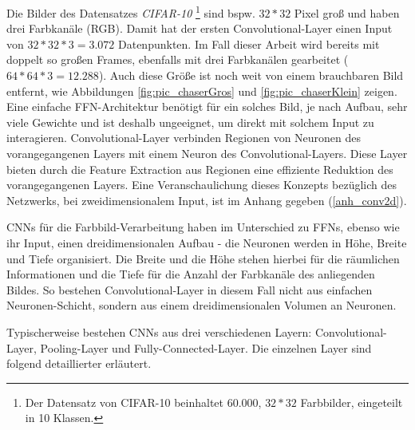 Die Bilder des Datensatzes \emph{CIFAR-10} \footnote{\label{foot:absch_RL_CNN_CIFAR10} Der Datensatz von CIFAR-10 beinhaltet 60.000, $32*32$ Farbbilder, eingeteilt in 10 Klassen.} \cite{cifar10_krizhevsky} sind bspw. $32*32$ Pixel groß und haben drei Farbkanäle (RGB). Damit hat der ersten Convolutional-Layer einen Input von $32*32*3 = 3.072$ Datenpunkten. Im Fall dieser Arbeit wird bereits mit doppelt so großen Frames, ebenfalls mit drei Farbkanälen gearbeitet ($64*64*3 = 12.288$). Auch diese Größe ist noch weit von einem brauchbaren Bild entfernt, wie Abbildungen \ref{fig:pic_chaserGros} und \ref{fig:pic_chaserKlein} zeigen. Eine einfache FFN-Architektur benötigt für ein solches Bild, je nach Aufbau, sehr viele Gewichte und ist deshalb ungeeignet, um direkt mit solchem Input zu interagieren. Convolutional-Layer verbinden Regionen von Neuronen des vorangegangenen Layers mit einem Neuron des Convolutional-Layers. Diese Layer bieten durch die Feature Extraction aus Regionen eine effiziente Reduktion des vorangegangenen Layers. Eine Veranschaulichung dieses Konzepts bezüglich des Netzwerks, bei zweidimensionalem Input, ist im Anhang gegeben (\ref{anh_conv2d}).

CNNs für die Farbbild-Verarbeitung haben im Unterschied zu FFNs, ebenso wie ihr Input, einen dreidimensionalen Aufbau - die Neuronen werden in Höhe, Breite und Tiefe organisiert. Die Breite und die Höhe stehen hierbei für die räumlichen Informationen und die Tiefe für die Anzahl der Farbkanäle des anliegenden Bildes. So bestehen Convolutional-Layer in diesem Fall nicht aus einfachen Neuronen-Schicht, sondern aus einem dreidimensionalen Volumen an Neuronen. 

Typischerweise bestehen CNNs aus drei verschiedenen Layern: Convolutional-Layer, Pooling-Layer und Fully-Connected-Layer. Die einzelnen Layer sind folgend detaillierter erläutert. 


